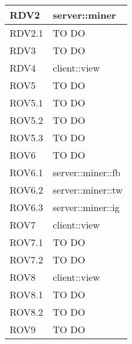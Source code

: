 \begin{center}
\begin{longtable}{| p{4cm} | p{8cm} |}
RDV2   &  server::miner \\
\hline
RDV2.1   &  TO DO \\
\hline
RDV3   &  TO DO \\
\hline
RDV4   &  client::view \\
\hline
ROV5   &  TO DO \\
\hline
ROV5.1   &  TO DO \\
\hline
ROV5.2   &  TO DO \\
\hline
ROV5.3   &  TO DO \\
\hline
ROV6   &  TO DO \\
\hline
ROV6.1   &  server::miner::fb \\
\hline
ROV6.2   &  server::miner::tw \\
\hline
ROV6.3   &  server::miner::ig \\
\hline
ROV7   &  client::view \\
\hline
ROV7.1   &  TO DO \\
\hline
ROV7.2   &  TO DO \\
\hline
ROV8   &  client::view \\
\hline
ROV8.1   &  TO DO \\
\hline
ROV8.2   &  TO DO \\
\hline
ROV9   &  TO DO \\
\hline
\end{longtable}
\egroup
\end{center}
